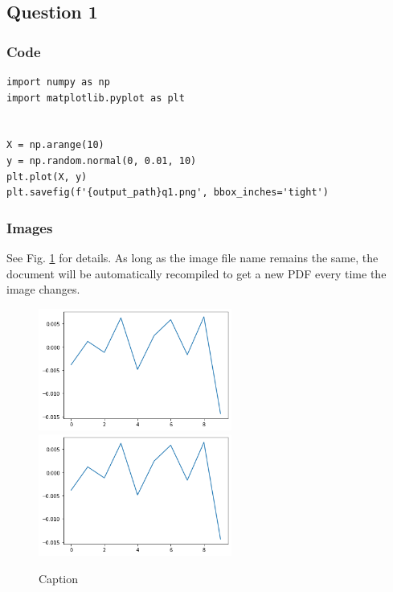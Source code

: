 \subsection{Question 1}
\subsubsection{Code}
\begin{verbatim}
import numpy as np
import matplotlib.pyplot as plt


X = np.arange(10)
y = np.random.normal(0, 0.01, 10)
plt.plot(X, y)
plt.savefig(f'{output_path}q1.png', bbox_inches='tight')
\end{verbatim}

\subsubsection{Images}
See Fig. \ref{fig:q1} for details.
As long as the image file name remains the same, the document will be automatically recompiled to get a new PDF every time the image changes.
\begin{figure}[H]
    \centering
    {\includegraphics[width=2.5in]{../images/q1/q1.png}}
    {\includegraphics[width=2.5in]{../images/q1/q1.png}}
    \caption{Caption\label{fig:q1}}
\end{figure}

